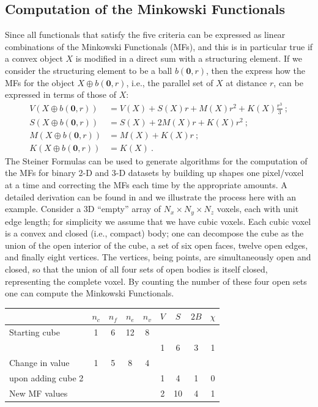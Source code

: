 \subsection{Computation of the Minkowski Functionals}\label{\chabbr:ssec:compMF}
Since all functionals that satisfy the five criteria can be expressed as linear combinations of the Minkowski Functionals (MFs), and this is in particular true if a convex object $X$ is modified in a direct sum with a structuring element. If we consider the structuring element to be a ball $b(\mathbf{0},r)$, then the  express how the MFs for the object $X\oplus b(\mathbf{0},r)$, i.e., the parallel set of $X$ at distance $r$, can be expressed in terms of those of $X$:
\begin{equation}
\begin{split}
	V(X\oplus b(\mathbf{0},r)) &= V(X) + S(X) r + M(X) r^2+K(X)\frac{r^3}{3}\ ;\\
	S(X\oplus b(\mathbf{0},r)) &= S(X)  + 2M(X) r+K(X)r^2\ ;\\
	M(X\oplus b(\mathbf{0},r)) &= M(X)+K(X)r\ ;\\
	K(X\oplus b(\mathbf{0},r)) &= K(X)\ .
\end{split}
\label{\chabbr:eq:Steiner}
\end{equation}
The Steiner Formulas can be used to generate algorithms for the computation of the MFs for binary 2-D and 3-D datasets by building up shapes one pixel/voxel at a time and correcting the MFs each time by the appropriate amounts.  A detailed derivation can be found in \cite{michielsen2000a} and we illustrate the process here with an example.  Consider a 3D ``empty'' array of $N_x\times N_y\times N_z$ voxels, each with unit edge length; for simplicity we assume that we have cubic voxels.  Each cubic voxel is a convex and closed (i.e., compact) body; one can decompose the cube as the union of the open interior of the cube, a set of six open faces, twelve open edges, and finally eight vertices. The vertices, being points, are simultaneously open and closed, so that the union of all four sets of open bodies is itself closed, representing the complete voxel. By counting the number of these four open sets one can compute the Minkowski Functionals.


\begin{table}[b!]
\centering\leavevmode
\begin{tabular}{|l|cccc|cccc|}
\hline
&$n_c$ & $n_f$ & $n_e$ & $n_v$ & $V$ & $S$ & $2B$ & $\chi$\\
\hline
Starting cube & 1 & 6 & 12 & 8 &&&&\\
&&&&&1&6&3&1\\
\hline
Change in value & 1 & 5 & 8 & 4 &&&&\\
upon adding cube 2 &&&&&1&4&1&0\\
\hline
New MF values &&&&&2&10&4&1\\
\hline
\end{tabular}
\end{table}

